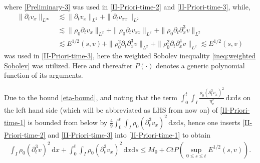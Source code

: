 \documentclass[11pt, reqno]{amsart}
\newcommand{\diff}{\mathrm{d}}
\numberwithin{equation}{section}
\begin{document}
where \eqref{Preliminary-3} was used in \eqref{II-Priori-time-2} and \eqref{II-Priori-time-3}, while,
\begin{equation*}
\begin{aligned}
\|\partial_tv_x\|_{L^\infty}&\lesssim \|\partial_tv_x\|_{L^2}+\|\partial_tv_{xx}\|_{L^2}\\
&\lesssim \|\rho_0\partial_tv_x\|_{L^2}+\|\rho_0\partial_tv_{xx}\|_{L^2}+\|\rho_0\partial_t\partial_x^3v\|_{L^2}\\
&\lesssim E^{1/2}(s,v)+\|\rho_0^2\partial_t\partial_x^3v\|_{L^2}+\|\rho_0^2\partial_t\partial_x^4v\|_{L^2}
\lesssim E^{1/2}(s,v)
\end{aligned}
\end{equation*}
was used in \eqref{II-Priori-time-3}, here the weighted Sobolev inequality \eqref{ineq:weighted Sobolev} was utilized. Here and thereafter \(P(\cdot)\) denotes a generic polynomial function of its arguments.


Due to the bound \eqref{eta-bound}, and noting that the term \(\int_0^t\int_I\frac{\rho_0(\partial_t^3v_x)^2}{\eta_x^2}\,\diff x\diff s\) on the left hand side (which will be abbreviated as LHS from now on) of \eqref{II-Priori-time-1} is bounded from below by \(\frac{4}{9}\int_0^t\int_I\rho_0(\partial_t^3v_x)^2\,\diff x\diff s\),
hence one inserts \eqref{II-Priori-time-2} and \eqref{II-Priori-time-3} into \eqref{II-Priori-time-1} to obtain
\begin{equation}\label{II-Priori-time-4}
\begin{aligned}
\int_I \rho_0(\partial_t^3v)^2\,\diff x
+\int_0^t\int_I\rho_0(\partial_t^3v_x)^2\,\diff x\diff s
\leq M_0+Ct P(\sup_{0\leq s\leq t}E^{1/2}(s,v)).
\end{aligned}
\end{equation}
\end{document}
